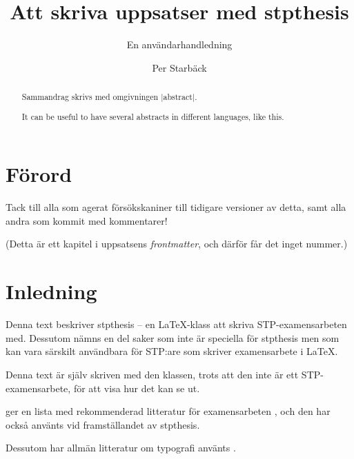 \documentclass[bachelor]{stpthesis}
\newcommand{\class}[1]{\textsf{#1}}
\begin{document}
\author{Per Starbäck}
\title{Att skriva uppsatser med stpthesis}
\subtitle{En användarhandledning}

\maketitle
\frontmatter*

\begin{abstract}
Sammandrag skrivs med omgivningen |abstract|.
\end{abstract}

\begin{otherlanguage}{british}
\begin{abstract}
It can be useful to have several abstracts in different languages,
like this.
\end{abstract}
\end{otherlanguage}

\clearpage
\tableofcontents*

\chapter{Förord}

Tack till alla som agerat försökskaniner till tidigare versioner av
detta, samt alla andra som kommit med kommentarer!

(Detta är ett kapitel i uppsatsens \emph{frontmatter},
och därför får det inget nummer.)

\mainmatter*
\chapter{Inledning}

Denna text beskriver \class{stpthesis} -- en LaTeX-klass
att skriva STP-examensarbeten med. Dessutom nämns en del
saker som inte är speciella för \class{stpthesis} men som kan vara
särskilt användbara för STP:are som skriver examensarbete i LaTeX.

Denna text är själv skriven med den klassen, trots att den inte är ett
STP-examensarbete, för att visa hur det kan se ut.

 ger en lista med rekommenderad litteratur
för examensarbeten
\citep{dahllof:akupp, saxena:mallar, stromquist:upp},
och den har också använts vid framställandet av \class{stpthesis}.

Dessutom har allmän litteratur om typografi använts
\citep{hellmark:th, bringhurst:elements, lansburgh}.
\end{document}
